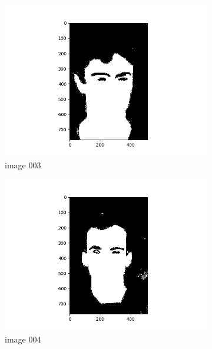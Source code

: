 \documentclass[11pt]{report}
\begin{document}
\begin{figure}[H]
\begin{subfigure}{0.3\textwidth}
        \includegraphics[width=\textwidth]{Task 2 Plots/bin_mask_003.png}
        \caption{image 003}
        \label{fig:binmask3}
    \end{subfigure}
    \begin{subfigure}{0.3\textwidth}
        \centering
        \includegraphics[width=\textwidth]{Task 2 Plots/bin_mask_004.png}
        \caption{image 004}
        \label{fig:binmask4}
    \end{subfigure}
    \begin{subfigure}{0.3\textwidth}
        \centering

\end{subfigure}
\end{figure}
\end{document}
